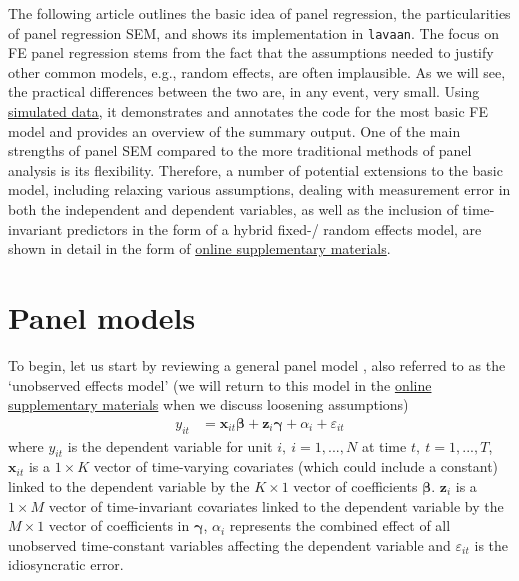 \documentclass[]{interact}
\theoremstyle{plain}%
\theoremstyle{definition}
\theoremstyle{remark}
\begin{document}
The following article outlines the basic idea of panel regression, the
particularities of panel regression SEM, and shows its implementation in
\texttt{lavaan}. The focus on FE panel regression stems from the fact
that the assumptions needed to justify other common models, e.g., random
effects, are often implausible. As we will see, the practical
differences between the two are, in any event, very small. Using
\href{https://github.com/henrik-andersen/FE-SEM/blob/master/simulation-code.R}{simulated
data}, it demonstrates and annotates the code for the most basic FE
model and provides an overview of the summary output. One of the main
strengths of panel SEM compared to the more traditional methods of panel
analysis is its flexibility. Therefore, a number of potential extensions
to the basic model, including relaxing various assumptions, dealing with
measurement error in both the independent and dependent variables, as
well as the inclusion of time-invariant predictors in the form of a
hybrid fixed-/ random effects model, are shown in detail in the form of
\href{https://github.com/henrik-andersen/FE-SEM/blob/master/extensions.pdf}{online
supplementary materials}.

\hypertarget{panel}{%
\section{Panel models}\label{panel}}

To begin, let us start by reviewing a general panel model
\citep{Bollen2010}, also referred to as the `unobserved effects model'
\citep{Wooldridge2012, R-plm_a} (we will return to this model in the
\href{https://github.com/henrik-andersen/FE-SEM/blob/master/extensions.pdf}{online
supplementary materials} when we discuss loosening assumptions)
\begin{align}
y_{it} & = \bm{x}_{it}\bm{\beta} + \bm{z}_{i}\bm{\gamma} + \alpha_{i} + \varepsilon_{it} \label{eq:gpm}
\end{align} where \(y_{it}\) is the dependent variable for unit
\(i, \ i = 1, ..., N\) at time \(t, \ t = 1, ..., T\), \(\bm{x}_{it}\)
is a \(1 \times K\) vector of time-varying covariates (which could
include a constant) linked to the dependent variable by the
\(K \times 1\) vector of coefficients \(\bm{\beta}\). \(\bm{z}_{i}\) is
a \(1 \times M\) vector of time-invariant covariates linked to the
dependent variable by the \(M \times 1\) vector of coefficients in
\(\bm{\gamma}\), \(\alpha_{i}\) represents the combined effect of all
unobserved time-constant variables affecting the dependent variable and
\(\varepsilon_{it}\) is the idiosyncratic error.
\end{document}
